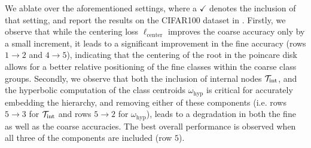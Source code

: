 \begin{table}[ht]
\centering
\caption{Ablation study on the components of \texttt{HypStructure}. We report the Classification accuracies based on the CIFAR100 model trained with ResNet-34. 
}
  \vspace{0.2cm}
    \centering
{}
\label{tab:ablation_component}
\end{table}



We ablate over the aforementioned settings, where a $\checkmark$ denotes the inclusion of that setting, and report the results on the CIFAR100 dataset in . Firstly, we observe that while the centering loss $\ell_\text{center}$ improves the coarse accuracy only by a small increment, it leads to a significant improvement in the fine accuracy (rows $ 1 \rightarrow 2$ and $4 \rightarrow 5$), indicating that the centering of the root in the poincare disk allows for a better relative positioning of the fine classes within the coarse class groups. Secondly, we observe that both the inclusion of internal nodes ${\mathcal{T}}_{\text{int}}$, and the hyperbolic computation of the class centroids $\omega_{\text{hyp}}$ is critical for accurately embedding the hierarchy, and removing either of these components (i.e. rows $ 5 \rightarrow 3$ for   ${\mathcal{T}}_{\text{int}}$ and rows $ 5 \rightarrow 2$ for $\omega_{\text{hyp}}$), leads to a degradation in both the fine as well as the coarse accuracies.  The best overall performance is observed when all three of the components are included (row $5$).



